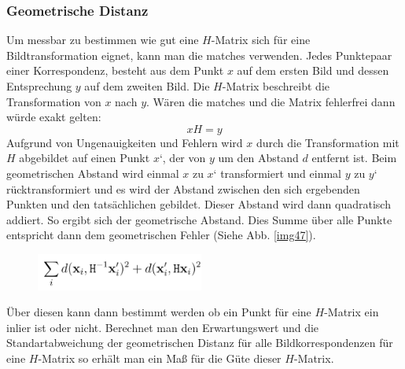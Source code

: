 \subsubsection{Geometrische Distanz}
Um messbar zu bestimmen wie gut eine $H$-Matrix sich für eine Bildtransformation eignet, kann man die matches verwenden. Jedes Punktepaar einer Korrespondenz, besteht aus dem Punkt $x$ auf dem ersten Bild und dessen Entsprechung $y$ auf dem zweiten Bild. Die $H$-Matrix beschreibt die Transformation von $x$ nach $y$. Wären die matches und die Matrix fehlerfrei dann würde exakt gelten:
$$x H= y$$
Aufgrund von Ungenauigkeiten und Fehlern wird $x$ durch die Transformation mit $H$ abgebildet auf einen Punkt $x‘$, der von $y$ um den Abstand $d$ entfernt ist. Beim geometrischen Abstand wird einmal $x$ zu $x‘$ transformiert und einmal $y$ zu $ y‘$ rücktransformiert und es wird der Abstand zwischen den sich ergebenden Punkten und den tatsächlichen gebildet. Dieser Abstand wird dann quadratisch addiert. So ergibt sich der geometrische Abstand. Dies Summe über alle Punkte entspricht dann dem geometrischen Fehler (Siehe Abb. \ref{img47}). 

\begin{figure}[ht]
    \centering
    \includegraphics[width=0.49\textwidth]{FiguresIS/47.jpg}
    \caption{\cite{Richard2000}}
     \label{img:47}
\end{figure}

Über diesen kann dann bestimmt werden ob ein Punkt für eine $H$-Matrix ein inlier ist oder nicht. Berechnet man den Erwartungswert und die Standartabweichung der geometrischen Distanz für alle Bildkorrespondenzen für eine $H$-Matrix so erhält man ein Maß für die Güte dieser $H$-Matrix.

